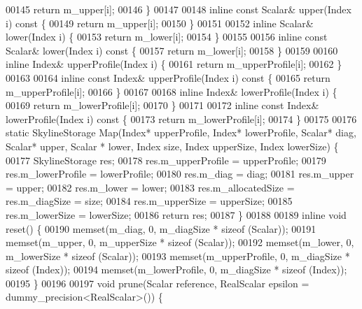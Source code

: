 \begin{DoxyCode}
00145         \textcolor{keywordflow}{return} m\_upper[i];
00146     \}
00147 
00148     \textcolor{keyword}{inline} \textcolor{keyword}{const} Scalar& upper(Index i)\textcolor{keyword}{ const }\{
00149         \textcolor{keywordflow}{return} m\_upper[i];
00150     \}
00151 
00152     \textcolor{keyword}{inline} Scalar& lower(Index i) \{
00153         \textcolor{keywordflow}{return} m\_lower[i];
00154     \}
00155 
00156     \textcolor{keyword}{inline} \textcolor{keyword}{const} Scalar& lower(Index i)\textcolor{keyword}{ const }\{
00157         \textcolor{keywordflow}{return} m\_lower[i];
00158     \}
00159 
00160     \textcolor{keyword}{inline} Index& upperProfile(Index i) \{
00161         \textcolor{keywordflow}{return} m\_upperProfile[i];
00162     \}
00163 
00164     \textcolor{keyword}{inline} \textcolor{keyword}{const} Index& upperProfile(Index i)\textcolor{keyword}{ const }\{
00165         \textcolor{keywordflow}{return} m\_upperProfile[i];
00166     \}
00167 
00168     \textcolor{keyword}{inline} Index& lowerProfile(Index i) \{
00169         \textcolor{keywordflow}{return} m\_lowerProfile[i];
00170     \}
00171 
00172     \textcolor{keyword}{inline} \textcolor{keyword}{const} Index& lowerProfile(Index i)\textcolor{keyword}{ const }\{
00173         \textcolor{keywordflow}{return} m\_lowerProfile[i];
00174     \}
00175 
00176     \textcolor{keyword}{static} SkylineStorage Map(Index* upperProfile, Index* lowerProfile, Scalar* diag, Scalar* upper, Scalar
      * lower, Index size, Index upperSize, Index lowerSize) \{
00177         SkylineStorage res;
00178         res.m\_upperProfile = upperProfile;
00179         res.m\_lowerProfile = lowerProfile;
00180         res.m\_diag = diag;
00181         res.m\_upper = upper;
00182         res.m\_lower = lower;
00183         res.m\_allocatedSize = res.m\_diagSize = size;
00184         res.m\_upperSize = upperSize;
00185         res.m\_lowerSize = lowerSize;
00186         \textcolor{keywordflow}{return} res;
00187     \}
00188 
00189     \textcolor{keyword}{inline} \textcolor{keywordtype}{void} reset() \{
00190         memset(m\_diag, 0, m\_diagSize * \textcolor{keyword}{sizeof} (Scalar));
00191         memset(m\_upper, 0, m\_upperSize * \textcolor{keyword}{sizeof} (Scalar));
00192         memset(m\_lower, 0, m\_lowerSize * \textcolor{keyword}{sizeof} (Scalar));
00193         memset(m\_upperProfile, 0, m\_diagSize * \textcolor{keyword}{sizeof} (Index));
00194         memset(m\_lowerProfile, 0, m\_diagSize * \textcolor{keyword}{sizeof} (Index));
00195     \}
00196 
00197     \textcolor{keywordtype}{void} prune(Scalar reference, RealScalar epsilon = dummy\_precision<RealScalar>()) \{

\end{DoxyCode}
